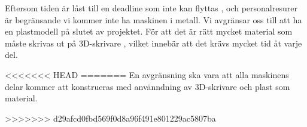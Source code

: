 
Eftersom tiden är låst till en deadline som inte kan flyttas , och personalresurer är begränsande 
vi kommer inte ha maskinen i metall. Vi avgränsar oss till att ha en plastmodell på slutet av projektet. För att det är rätt mycket material som måste skrivas ut på 3D-skrivare , vilket innebär att det krävs mycket tid åt varje del.

<<<<<<< HEAD
=======
En avgränsning ska vara att alla maskinens delar kommer att konstrueras med använndning av 3D-skrivare och plast som material. 
\iffalse
Eftersom existerande verktyg som används är den enda stora begränsningen den tid det tar att genomföra 
projektet. Tiden är låst till en deadline som inte kan flyttas, och personalresurser är begränsade. 
Följaktligen är kvaliteten den enda variabel som kan ändras om projektet löper risk att inte bli klar 
på utsatt tid.
\fi
>>>>>>> d29afcd0fbd569f0d8a96f491e801229ac5807ba
